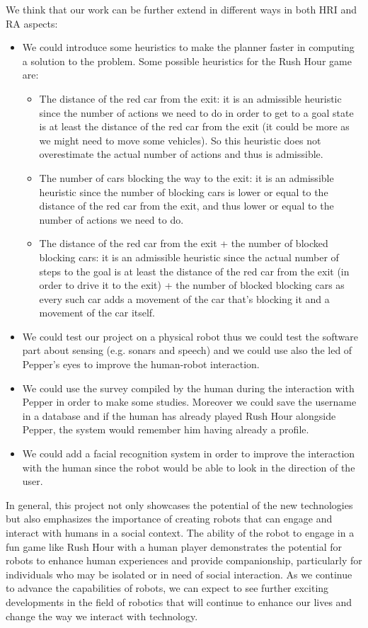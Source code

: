 \documentclass{article}
\begin{document}
\noindent We think that our work can be further extend in different ways in both HRI and RA aspects:
\begin{itemize}
    \item We could introduce some heuristics to make the planner faster in computing a solution to the problem. Some possible heuristics for the Rush Hour game are:
    \begin{itemize}
        \item The distance of the red car from the exit: it is an admissible heuristic since the number of actions we need to do in order to get to a goal state is at least the distance of the red car from the exit (it could be more as we might need to move some vehicles). So this heuristic does not overestimate the actual number of actions and thus is admissible.
        \item The number of cars blocking the way to the exit: it is an admissible heuristic since the number of blocking cars is lower or equal to the distance of the red car from the exit, and thus lower or equal to the number of actions we need to do.
        \item  The distance of the red car from the exit + the number of blocked blocking cars: it is an admissible heuristic since the actual number of steps to the goal is at least the distance of the red car from the exit (in order to drive it to the exit) + the number of blocked blocking cars as every such car adds a movement of the car that’s blocking it and a movement of the car itself.
    \end{itemize}
    \item We could test our project on a physical robot thus we could test the software part about sensing (e.g. sonars and speech) and we could use also the led of Pepper's eyes to improve the human-robot interaction.
    \item We could use the survey compiled by the human during the interaction with Pepper in order to make some studies. Moreover we could save the username in a database and if the human has already played Rush Hour alongside Pepper, the system would remember him having already a profile.
    \item We could add a facial recognition system in order to improve the interaction with the human since the robot would be able to look in the direction of the user.
\end{itemize} 

\indent In general, this project not only showcases the potential of the new technologies but also emphasizes the importance of creating robots that can engage and interact with humans in a social context. The ability of the robot to engage in a fun game like Rush Hour with a human player demonstrates the potential for robots to enhance human experiences and provide companionship, particularly for individuals who may be isolated or in need of social interaction. As we continue to advance the capabilities of robots, we can expect to see further exciting developments in the field of robotics that will continue to enhance our lives and change the way we interact with technology.




\newpage

\end{document}
